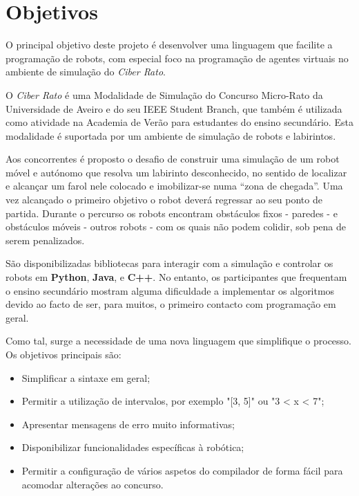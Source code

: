 \documentclass{report}
\begin{document}
\tableofcontents


\clearpage
{}

\chapter{Objetivos}
\label{chap.objectives}

O principal objetivo deste projeto é desenvolver uma linguagem que facilite a programação de robots, com especial foco na programação de agentes virtuais no ambiente de simulação do \textsl{Ciber Rato}.

O \textsl{Ciber Rato}  é uma Modalidade de Simulação do Concurso Micro-Rato da Universidade de Aveiro e do seu IEEE Student Branch, que também é utilizada como atividade na Academia de Verão para estudantes do ensino secundário. Esta modalidade é suportada por um ambiente de simulação de robots e labirintos.

Aos concorrentes é proposto o desafio de construir uma simulação de um robot móvel e autónomo que resolva um labirinto desconhecido, no sentido de localizar e alcançar um farol nele colocado e imobilizar-se numa “zona de chegada”. Uma vez alcançado o primeiro objetivo o robot deverá regressar ao seu ponto de partida. Durante o percurso os robots encontram obstáculos fixos - paredes - e obstáculos móveis - outros robots - com os quais não podem colidir, sob pena de serem penalizados.

São disponibilizadas bibliotecas para interagir com a simulação e controlar os robots em \textbf{Python}, \textbf{Java}, e \textbf{C++}. No entanto, os participantes que frequentam o ensino secundário mostram alguma dificuldade a implementar os algoritmos devido ao facto de ser, para muitos, o primeiro contacto com programação em geral. 

Como tal, surge a necessidade de uma nova linguagem que simplifique o processo. Os objetivos principais são:
\begin{itemize}
    \item Simplificar a sintaxe em geral;
    \item Permitir a utilização de intervalos, por exemplo "[3, 5]" ou "3 < x < 7";
    \item Apresentar mensagens de erro muito informativas;
    \item Disponibilizar funcionalidades específicas à robótica;
    \item Permitir a configuração de vários aspetos do compilador de forma fácil para acomodar alterações ao concurso.
\end{itemize}
\end{document}

